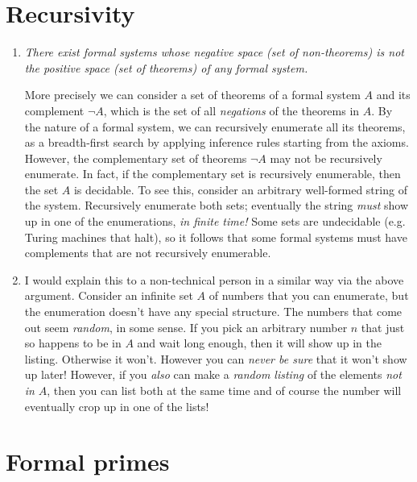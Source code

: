 \documentclass[11pt,letterpaper]{article}
\begin{document}
\section{Recursivity}

\begin{enumerate}
  \item
    \emph{%
      There exist formal systems whose negative space (set of non-theorems) is
      not the positive space (set of theorems) of any formal system.%
    }

    More precisely we can consider a set of theorems of a formal system $A$ and
    its complement $\neg A$, which is the set of all \emph{negations} of the
    theorems in $A$.
    By the nature of a formal system, we can recursively enumerate all its
    theorems, as a breadth-first search by applying inference rules starting
    from the axioms.
    However, the complementary set of theorems $\neg A$ may not be recursively
    enumerate.
    In fact, if the complementary set is recursively enumerable, then the set
    $A$ is decidable. To see this, consider an arbitrary well-formed string of
    the system.
    Recursively enumerate both sets; eventually the string \emph{must} show up
    in one of the enumerations, \emph{in finite time!}
    Some sets are undecidable (e.g. Turing machines that halt), so it follows
    that some formal systems must have complements that are not recursively
    enumerable.

  \item
    I would explain this to a non-technical person in a similar way via the
    above argument. Consider an infinite set $A$ of numbers that you can
    enumerate, but the enumeration doesn't have any special structure. The
    numbers that come out seem \emph{random}, in some sense. If you pick an
    arbitrary number $n$ that just so happens to be in $A$ and wait long
    enough, then it will show up in the listing. Otherwise it won't. However
    you can \emph{never be sure} that it won't show up later! However, if you
    \emph{also} can make a \emph{random listing} of the elements \emph{not in}
    $A$, then you can list both at the same time and of course the number will
    eventually crop up in one of the lists!
\end{enumerate}

\section{Formal primes}
\end{document}
